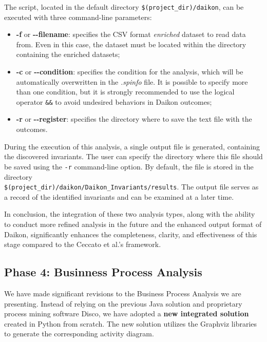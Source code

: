 The script, located in the default directory \texttt{\$(project\_dir)/daikon}, can be executed with three command-line parameters:

\begin{itemize}
	\item \textbf{-f} or \textbf{{-}{-}filename}: specifies the CSV format \textit{enriched} dataset to read data from. Even in this case, the dataset must be located within the directory containing the enriched datasets;
	
	\item \textbf{-c} or \textbf{{-}{-}condition}: specifies the condition for the analysis, which will be automatically overwritten in the \textit{.spinfo} file. It is possible to specify more than one condition, but it is strongly recommended to use the logical operator \texttt{\&\&} to avoid undesired behaviors in Daikon outcomes;
	
	\item \textbf{-r} or \textbf{{-}{-}register}: specifies the directory where to save the text file with the outcomes.
\end{itemize}

During the execution of this analysis, a single output file is generated, containing the discovered invariants. The user can specify the directory where this file should be saved using the \texttt{-r} command-line option. By default, the file is stored in the directory\\ \texttt{\$(project\_dir)/daikon/Daikon\_Invariants/results}. The output file serves as a record of the identified invariants and can be examined at a later time. 

\bigskip
In conclusion, the integration of these two analysis types, along with the ability to conduct more refined analysis in the future and the enhanced output format of Daikon, significantly enhances the completeness, clarity, and effectiveness of this stage compared to the Ceccato et al.'s framework.

\subsection{Phase 4: Businness Process Analysis}
\label{subsec:4_improve_bpa}
We have made significant revisions to the Business Process Analysis we are presenting. Instead of relying on the previous Java solution and proprietary process mining software Disco, we have adopted a \textbf{new integrated solution} created in Python from scratch. The new solution utilizes the Graphviz libraries to generate the corresponding activity diagram.

